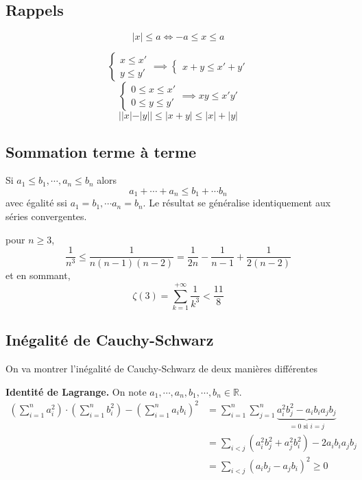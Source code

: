 \subsection{Rappels}

\[
    |x|\leq a\iff -a\leq x\leq a
\]

\[
    \begin{cases}
        x\leq x'\\ y\leq y'
    \end{cases}
    \implies \begin{cases}
        x+y\leq x'+y'
    \end{cases}
\]
\[
    \begin{cases}
        0\leq x\leq x'\\ 0\leq y\leq y'
    \end{cases}
    \implies xy\leq x'y'
\]
\[
    ||x|-|y||\leq |x+y|\leq |x|+|y|
\]

\subsection{Sommation terme à terme}

Si $a_1\leq b_1, \cdots, a_n\leq b_n$ alors \[
    a_1+\cdots +a_n\leq b_1+\cdots b_n
\]
avec égalité ssi $a_1=b_1,\cdots a_n=b_n$. Le résultat se généralise identiquement aux séries convergentes.

\begin{ex}
    pour $n\geq 3$, \[
        \frac1{n^3}\leq \frac1{n(n-1)(n-2)}=\frac1{2n}-\frac1{n-1}+\frac1{2(n-2)}
    \]
    et en sommant, \[
        \zeta(3)=\sum_{k=1}^{+\infty}\frac1{k^3}< \frac{11}8
    \]
\end{ex}

\subsection{Inégalité de Cauchy-Schwarz}


On va montrer l'inégalité de Cauchy-Schwarz de deux manières différentes


\textbf{Identité de Lagrange.} On note $a_1, \cdots, a_n, b_1, \cdots, b_n\in\mathbb R$. \begin{align*}
        \left( \sum_{i=1}^na_i^2 \right) \cdot \left( \sum_{i=1}^n b_i^2 \right)- \left( \sum_{i=1}^na_ib_i \right)^2 &= \sum_{i=1}^n\sum_{j=1}^n \underbrace{a_i^2b_j^2-a_ib_ia_jb_j}_{=0\text{ si }i=j} \\
                                                                                                                      &= \sum_{i<j}(a_i^2b_j^2+a_j^2b_i^2)-2a_ib_ia_jb_j \\ 
                                                                                                                      &= \sum_{i<j}(a_ib_j-a_jb_i)^2\geq 0
    \end{align*}

